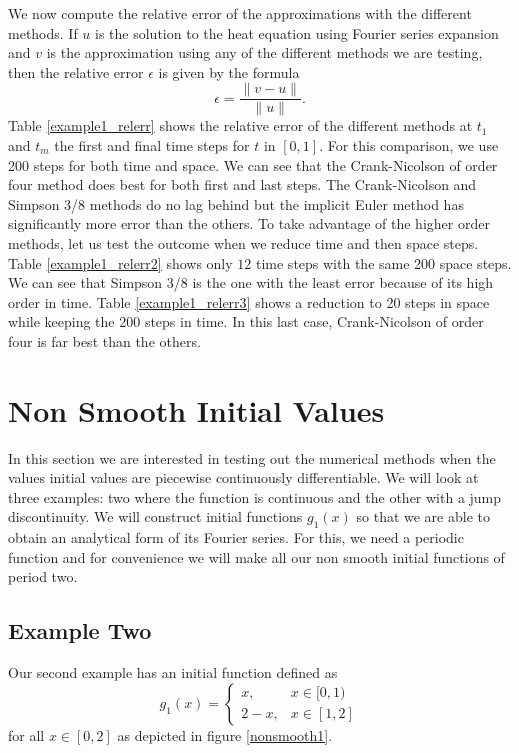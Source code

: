 \documentclass[00main.tex]{subfiles}
\begin{document}
We now compute the relative error of the approximations with the different methods. If $u$ is the solution to the heat equation using Fourier series expansion and $v$ is the approximation using any of the different methods we are testing, then the relative error $\epsilon$ is given by the formula \[ \epsilon = \frac{\| v-u \|}{\|u\|}. \]
Table \ref{example1_relerr} shows the relative error of the different methods at $t_{1}$ and $t_m$ the first and final time steps for $t$ in $[0,1]$. For this comparison, we use 200 steps for both time and space. We can see that the Crank-Nicolson of order four method does best for both first and last steps. The Crank-Nicolson and Simpson 3/8 methods do no lag behind but the implicit Euler method has significantly more error than the others.
To take advantage of the higher order methods, let us test the outcome when we reduce time and then space steps. Table \ref{example1_relerr2} shows only $12$ time steps with the same 200 space steps. We can see that Simpson 3/8 is the one with the least error because of its high order in time. Table \ref{example1_relerr3} shows a reduction to 20 steps in space while keeping the 200 steps in time. In this last case, Crank-Nicolson of order four is far best than the others. 



\section{Non Smooth Initial Values}



In this section we are interested in testing out the numerical methods when the values initial values are piecewise continuously differentiable. We will look at three examples: two where the function is continuous and the other with a jump discontinuity. We will construct initial functions $g_1(x)$ so that we are able to obtain an analytical form of its Fourier series. For this, we need a periodic function and for convenience we will make all our non smooth initial functions of period two.

\subsection{Example Two}

Our second example has an initial function defined as \begin{equation}
g_1(x) = \left\lbrace \begin{array}{ll}
x, & x\in [0,1) \\
2-x, & x \in [1, 2]
\end{array} \right.
\end{equation} for all $x \in [0,2]$ as depicted in figure \ref{nonsmooth1}. %
\end{document}
